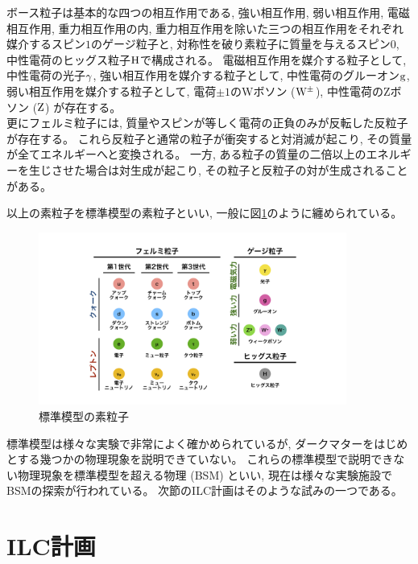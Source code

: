 ボース粒子は基本的な四つの相互作用である, 強い相互作用, 弱い相互作用, 電磁相互作用, 重力相互作用の内, 重力相互作用を除いた三つの相互作用をそれぞれ媒介するスピン$1$のゲージ粒子と, 対称性を破り素粒子に質量を与えるスピン$0$, 中性電荷のヒッグス粒子$\rm H$で構成される。
電磁相互作用を媒介する粒子として, 中性電荷の光子$\rm \gamma$, 強い相互作用を媒介する粒子として, 中性電荷のグルーオン$\rm g$, 弱い相互作用を媒介する粒子として, 電荷$\pm 1$のWボソン ($\rm W^{\pm}$), 中性電荷のZボソン ($\rm Z$) が存在する。\\

更にフェルミ粒子には, 質量やスピンが等しく電荷の正負のみが反転した反粒子が存在する。
これら反粒子と通常の粒子が衝突すると対消滅が起こり, その質量が全てエネルギーへと変換される。
一方, ある粒子の質量の二倍以上のエネルギーを生じさせた場合は対生成が起こり, その粒子と反粒子の対が生成されることがある。

以上の素粒子を標準模型の素粒子といい, 一般に図\ref{1SMParticle}のように纏められている。

\begin{figure}[htbp]
 \centering
 \includegraphics[width=0.9\textwidth]{Figure/1Introduction/1SMParticle.png}
 \caption{標準模型の素粒子}
 \label{1SMParticle}
\end{figure}

標準模型は様々な実験で非常によく確かめられているが, ダークマターをはじめとする幾つかの物理現象を説明できていない。
これらの標準模型で説明できない物理現象を標準模型を超える物理 (BSM) といい, 現在は様々な実験施設でBSMの探索が行われている。
次節のILC計画はそのような試みの一つである。


\section{ILC計画} \label{Intro:InternationalLinearColliderProject}

